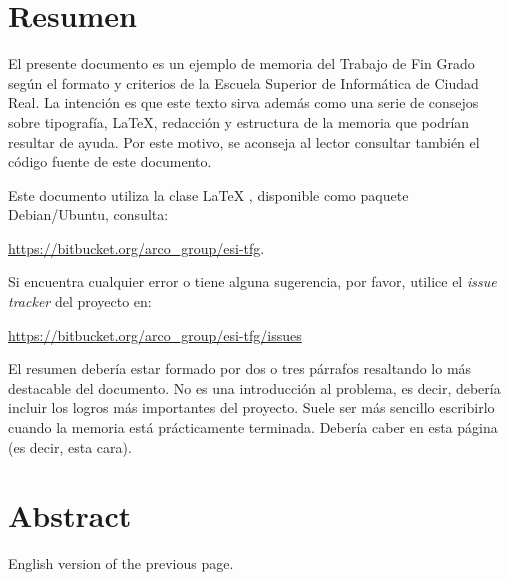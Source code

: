 \chapter{Resumen}

El presente documento es un ejemplo de memoria del Trabajo de Fin Grado según el
formato y criterios de la Escuela Superior de Informática de Ciudad Real. La
intención es que este texto sirva además como una serie de consejos sobre
tipografía, \LaTeX, redacción y estructura de la memoria que podrían resultar de
ayuda. Por este motivo, se aconseja al lector consultar también el código fuente
de este documento.

Este documento utiliza la clase \LaTeX{} \esitfg{}, disponible como paquete
Debian/Ubuntu, consulta:

 \url{https://bitbucket.org/arco_group/esi-tfg}.

Si encuentra cualquier error o tiene alguna sugerencia, por favor, utilice
el \emph{issue tracker} del proyecto \esitfg{} en:

\url{https://bitbucket.org/arco_group/esi-tfg/issues}

El resumen debería estar formado por dos o tres párrafos resaltando lo más
destacable del documento. No es una introducción al problema, es decir, debería
incluir los logros más importantes del proyecto. Suele ser más sencillo
escribirlo cuando la memoria está prácticamente terminada. Debería caber en esta
página (es decir, esta cara).


\chapter{Abstract}

English version of the previous page.
